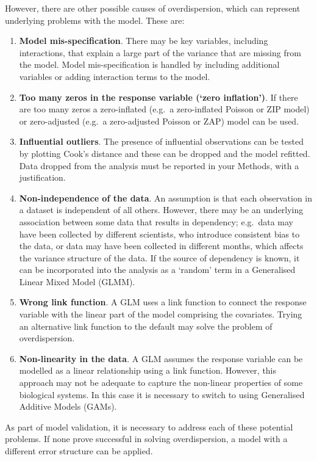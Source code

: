 \documentclass[
]{book}
\begin{document}
However, there are other possible causes of overdispersion, which can represent underlying problems with the model. These are:

\begin{enumerate}
\def\labelenumi{\arabic{enumi}.}
\item
  \textbf{Model mis-specification}. There may be key variables, including interactions, that explain a large part of the variance that are missing from the model. Model mis-specification is handled by including additional variables or adding interaction terms to the model.
\item
  \textbf{Too many zeros in the response variable (`zero inflation')}. If there are too many zeros a zero-inflated (e.g.~a zero-inflated Poisson or ZIP model) or zero-adjusted (e.g.~a zero-adjusted Poisson or ZAP) model can be used.
\item
  \textbf{Influential outliers}. The presence of influential observations can be tested by plotting Cook's distance and these can be dropped and the model refitted. Data dropped from the analysis must be reported in your Methods, with a justification.
\item
  \textbf{Non-independence of the data}. An assumption is that each observation in a dataset is independent of all others. However, there may be an underlying association between some data that results in dependency; e.g.~data may have been collected by different scientists, who introduce consistent bias to the data, or data may have been collected in different months, which affects the variance structure of the data. If the source of dependency is known, it can be incorporated into the analysis as a `random' term in a Generalised Linear Mixed Model (GLMM).
\item
  \textbf{Wrong link function}. A GLM uses a link function to connect the response variable with the linear part of the model comprising the covariates. Trying an alternative link function to the default may solve the problem of overdispersion.
\item
  \textbf{Non-linearity in the data}. A GLM assumes the response variable can be modelled as a linear relationship using a link function. However, this approach may not be adequate to capture the non-linear properties of some biological systems. In this case it is necessary to switch to using Generalised Additive Models (GAMs).
\end{enumerate}

As part of model validation, it is necessary to address each of these potential problems. If none prove successful in solving overdispersion, a model with a different error structure can be applied.
\end{document}
